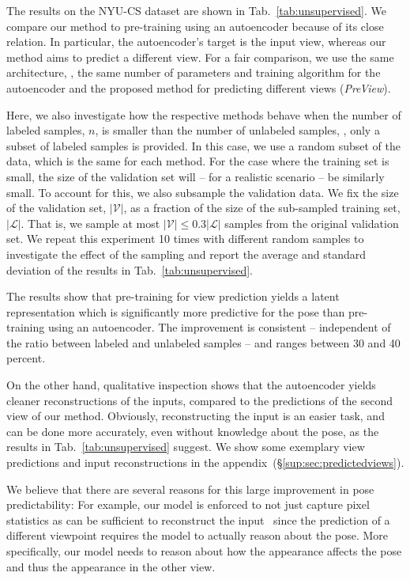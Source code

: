 \documentclass[10pt,twocolumn,letterpaper]{article}
\begin{document}
The results on the NYU-CS dataset are shown in Tab.~\ref{tab:unsupervised}.
We compare our method to pre-training using an autoencoder because of its close relation.
In particular, the autoencoder's target is the input view, whereas 
our method aims to predict a different view.
For a fair comparison, we use the same architecture, \ie, 
the same number of parameters and training algorithm
for the autoencoder and the proposed method for predicting different views (\emph{PreView}).

Here, we also investigate how the respective methods behave 
when the number of labeled samples, $n$, is smaller than the number of unlabeled samples,
\ie, only a subset of labeled samples is provided.
In this case, we use a random subset of the data, which is the same for each method.
For the case where the training set is small,
the size of the validation set will -- for a realistic scenario -- be similarly small.
To account for this, we also subsample the validation data.
We fix the size of the validation set, 
$\left| \mathcal{V} \right|$, as a fraction of
the size of the sub-sampled training set, $\left| \mathcal{L} \right|$. 
That is, we sample at most 
$\left| \mathcal{V} \right| \leq 0.3 \left| \mathcal{L} \right|$ samples 
from the original validation set.
We repeat this experiment 10 times with different random samples
to investigate the effect of the sampling and 
report the average and standard deviation of the results in Tab.~\ref{tab:unsupervised}.

The results show that pre-training for view prediction yields a 
latent representation which is significantly more predictive for the pose 
than pre-training using an autoencoder.
The improvement is consistent 
-- independent of the ratio between labeled and unlabeled samples -- 
and ranges between 30 and 40 percent.

On the other hand, qualitative inspection shows that 
the autoencoder yields cleaner reconstructions 
of the inputs, compared to the predictions of the second view of our method.
Obviously, reconstructing the input is an easier task, and can be done 
more accurately, even without knowledge about the pose, as the results  
in Tab.~\ref{tab:unsupervised} suggest.
We show some exemplary view predictions 
and input reconstructions in the appendix~(\S\ref{sup:sec:predictedviews}).

We believe that there are several reasons for this large improvement in pose predictability: 
For example, our model is enforced to not just capture pixel statistics 
as can be sufficient to reconstruct the 
input~\cite{Hotelling1933jedupsy_pca,Kirby1990pami_eigenfaces,Pearson1901philmag_pca}
since the prediction of a different viewpoint requires the model to actually 
reason about the pose. 
More specifically, our model needs to reason about how the appearance affects the pose 
and thus the appearance in the other view.
\end{document}
